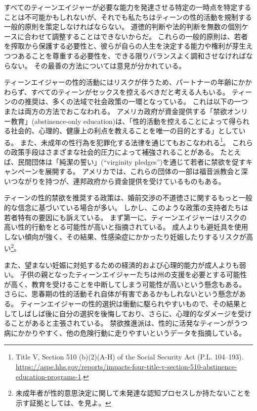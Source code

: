 \documentclass[paper=a4,book,openany]{jlreq}
\begin{document}
すべてのティーンエイジャーが必要な能力を発達させる特定の一時点を特定することは不可能かもしれないが、それでも私たちはティーンの性的活動を規制する一般的原則を策定しなければならない。
道徳的判断や法的判断を無数の個別ケースに合わせて調整することはできないからだ。
これらの一般的原則は、若者を搾取から保護する必要性と、彼らが自らの人生を決定する能力や権利が芽生えつつあることを尊重する必要性を、できる限りバランスよく調和させなければならない。
その最善の方法については意見が分かれている。

ティーンエイジャーの性的活動にはリスクが伴うため、パートナーの年齢にかかわらず、すべてのティーンがセックスを控えるべきだと考える人もいる。
ティーンのの推奨は、多くの法域で社会政策の一環となっている。
これは以下の一つまたは両方の方法でおこなわれる。
アメリカ政府が資金提供する「禁欲オンリー教育」(abstinence-only education)は、「性的活動を控えることによって得られる社会的、心理的、健康上の利点を教えることを唯一の目的とする」としている。
また、未成年の性行為を犯罪化する法律を通じてもおこなわれる\footnote{Title V, Section 510 (b)(2)(A-H) of the Social Security Act (P.L. 104--193). \url{https://aspe.hhs.gov/reports/impacts-four-title-v-section-510-abstinence-education-programs-1}.}。
これらの政策手段はさまざまな社会的圧力によって補強されることがある。
たとえば、民間団体は「純潔の誓い」(``virginity pledges'')を通じて若者に禁欲を促すキャンペーンを展開する。
アメリカでは、これらの団体の一部は福音派教会と深いつながりを持つが、連邦政府から資金提供を受けているものもある。

ティーンの性的禁欲を推奨する政策は、婚前交渉の不道徳さに関するもっと一般的な信念に基づいている場合が多い。
しかし、このような政策の支持者たちは若者特有の要因にも訴えている。
まず第一に、ティーンエイジャーはリスクの高い性的行動をとる可能性が高いと指摘されている。
成人よりも避妊具を使用しない傾向が強く、その結果、性感染症にかかったり妊娠したりするリスクが高い\footnote{未成年者が性的意思決定に関して未発達な認知プロセスしか持たないことを示す証拠としては、\citet{drobac14:_neurob_decis_makin_high_risk}を見よ。
}。

また、望まない妊娠に対処するための経済的および心理的能力が成人よりも弱い。
子供の親となったティーンエイジャーたちは州の支援を必要とする可能性が高く、教育を受けることを中断してしまう可能性が高いという懸念もある。
さらに、思春期の性的活動それ自体が有害であるかもしれないという懸念がある。
ティーンエイジャーの性的選択は衝動に駆られやすいもので、その結果としてしばしば後に自分の選択を後悔しており、さらに、心理的なダメージを受けることがあると主張されている。
禁欲推進派は、性的に活発なティーンがうつ病にかかりやすく、他の危険行動に走りやすいというデータを指摘している\citep[pp. 163--170]{hallfors05:_which_comes_first_adoles}。
\end{document}
